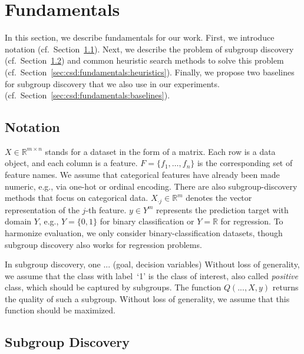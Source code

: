 \documentclass{article}
\theoremstyle{definition}
\begin{document}
\section{Fundamentals}
\label{sec:csd:fundamentals}

In this section, we describe fundamentals for our work.
First, we introduce notation (cf.~Section~\ref{sec:csd:fundamentals:notation}).
Next, we describe the problem of subgroup discovery (cf.~Section~\ref{sec:csd:fundamentals:subgroup-discovery}) and common heuristic search methods to solve this problem (cf.~Section~\ref{sec:csd:fundamentals:heuristics}).
Finally, we propose two baselines for subgroup discovery that we also use in our experiments. (cf.~Section~\ref{sec:csd:fundamentals:baselines}).

\subsection{Notation}
\label{sec:csd:fundamentals:notation}

$X \in \mathbb{R}^{m \times n}$ stands for a dataset in the form of a matrix.
Each row is a data object, and each column is a feature.
$F = \{f_1, \dots, f_n\}$ is the corresponding set of feature names.
We assume that categorical features have already been made numeric, e.g., via one-hot or ordinal encoding.
There are also subgroup-discovery methods that focus on categorical data.
$X_{\cdot{}j} \in \mathbb{R}^m$ denotes the vector representation of the $j$-th feature.
$y \in Y^m$ represents the prediction target with domain $Y$, e.g., $Y=\{0,1\}$ for binary classification or $Y=\mathbb{R}$ for regression.
To harmonize evaluation, we only consider binary-classification datasets, though subgroup discovery also works for regression problems.

In subgroup discovery, one ... (goal, decision variables)
Without loss of generality, we assume that the class with label~`1' is the class of interest, also called \emph{positive} class, which should be captured by subgroups.
The function $Q(...,X,y)$ returns the quality of such a subgroup.
Without loss of generality, we assume that this function should be maximized.

\subsection{Subgroup Discovery}
\label{sec:csd:fundamentals:subgroup-discovery}

\cite{helal2016subgroup} \cite{herrera2011overview} \cite{atzmueller2015subgroup} \cite{ventura2018subgroup} \cite{meeng2021real}
\end{document}
